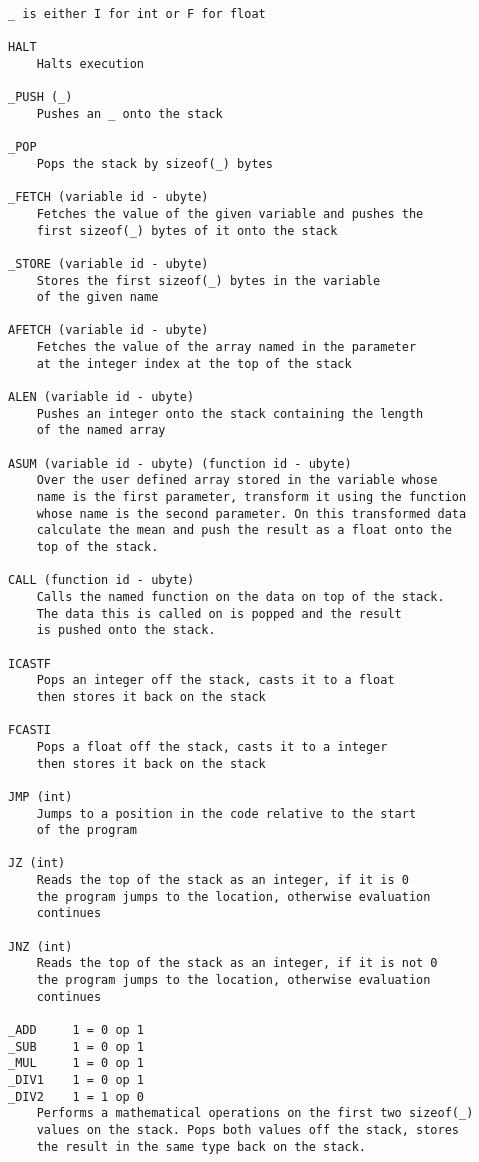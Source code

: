 \begin{verbatim}
_ is either I for int or F for float

HALT
    Halts execution

_PUSH (_)
    Pushes an _ onto the stack

_POP
    Pops the stack by sizeof(_) bytes

_FETCH (variable id - ubyte)
    Fetches the value of the given variable and pushes the
    first sizeof(_) bytes of it onto the stack

_STORE (variable id - ubyte)
    Stores the first sizeof(_) bytes in the variable
    of the given name

AFETCH (variable id - ubyte)
    Fetches the value of the array named in the parameter
    at the integer index at the top of the stack

ALEN (variable id - ubyte)
    Pushes an integer onto the stack containing the length
    of the named array
	
ASUM (variable id - ubyte) (function id - ubyte)
    Over the user defined array stored in the variable whose
    name is the first parameter, transform it using the function
    whose name is the second parameter. On this transformed data
    calculate the mean and push the result as a float onto the
    top of the stack.

CALL (function id - ubyte)
    Calls the named function on the data on top of the stack.
    The data this is called on is popped and the result
    is pushed onto the stack.

ICASTF
    Pops an integer off the stack, casts it to a float
    then stores it back on the stack

FCASTI
    Pops a float off the stack, casts it to a integer
    then stores it back on the stack

JMP (int)
    Jumps to a position in the code relative to the start
    of the program

JZ (int)
    Reads the top of the stack as an integer, if it is 0
    the program jumps to the location, otherwise evaluation
    continues

JNZ (int)
    Reads the top of the stack as an integer, if it is not 0
    the program jumps to the location, otherwise evaluation
    continues

_ADD     1 = 0 op 1
_SUB     1 = 0 op 1
_MUL     1 = 0 op 1
_DIV1    1 = 0 op 1
_DIV2    1 = 1 op 0
    Performs a mathematical operations on the first two sizeof(_)
    values on the stack. Pops both values off the stack, stores
    the result in the same type back on the stack.


\end{verbatim}
